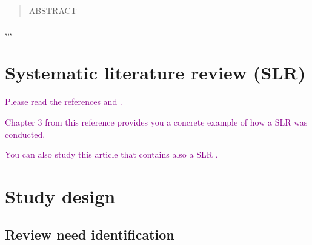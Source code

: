 \documentclass[a4paper,fleqn]{cas-dc}
\begin{document}

\fntext[1]{}


\begin{abstract}
ABSTRACT 
\end{abstract}



\begin{keywords}
 \sep \sep \sep
\end{keywords}

\maketitle



\section{Systematic literature review (SLR)}


\textcolor{darkmagenta}{Please read the references \cite{Kitchenham2007} and \cite{Kitchenham2004}.}

\textcolor{darkmagenta}{Chapter 3 from this reference \cite{Campeanu2018} provides you a concrete example of how a SLR was conducted.}

\textcolor{darkmagenta}{You can also study this article that contains also a SLR \cite{DavilaSLR2021}.}

\section{Study design}

\subsection{Review need identification}
\end{document}
